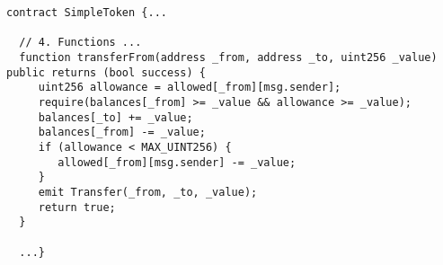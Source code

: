 \begin{lstlisting}[language=Solidity]
contract SimpleToken {...

  // 4. Functions ...
  function transferFrom(address _from, address _to, uint256 _value) public returns (bool success) {
     uint256 allowance = allowed[_from][msg.sender];
     require(balances[_from] >= _value && allowance >= _value);
     balances[_to] += _value;
     balances[_from] -= _value;
     if (allowance < MAX_UINT256) {
        allowed[_from][msg.sender] -= _value;
     }
     emit Transfer(_from, _to, _value); 
     return true;
  }
    
  ...}
\end{lstlisting}